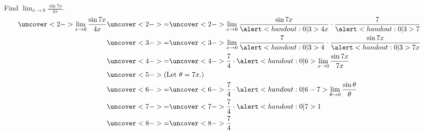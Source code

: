 \begin{frame}
\begin{example}%
Find $\lim_{x\rightarrow 0}\frac{\sin 7x}{4x}$.
\abovedisplayskip=0pt
\belowdisplayskip=0pt
\abovedisplayshortskip=0pt
\belowdisplayshortskip=0pt
\begin{align*}
\uncover<2->{%
\lim_{x\rightarrow 0} \frac{\sin 7x}{4x}%
}%
& \uncover<2->{ = }  %
\uncover<2->{%
\lim_{x\rightarrow 0} \frac{\sin 7x}{\alert<handout:0| 3>{4}x}\cdot \frac{7}{\alert<handout:0| 3>{7}}%
}\\%
& \uncover<3->{ = }  %
\uncover<3->{%
\lim_{x\rightarrow 0} \frac{7}{\alert<handout:0| 3>{4}}\cdot \frac{\sin 7x}{\alert<handout:0| 3>{7}x}%
}\\%
& \uncover<4->{ = }  %
\uncover<4->{%
\frac{7}{4}\cdot \alert<handout:0| 6>{\lim_{x\rightarrow 0}  \frac{\sin 7x}{7x}}%
}\\%
&  \uncover<5->{\text{(Let $\theta = 7x$.)}}\\%
& \uncover<6->{ = }  %
\uncover<6->{%
\frac{7}{4}\cdot \alert<handout:0| 6-7>{\lim_{\theta \rightarrow 0}  \frac{\sin \theta}{\theta}}%
}\\%
& \uncover<7->{ = }  %
\uncover<7->{%
\frac{7}{4}\cdot \alert<handout:0| 7>{1}%
}\\%
& \uncover<8->{ = }  %
\uncover<8->{%
\frac{7}{4}%
}%
\end{align*}
\end{example}
\end{frame}
